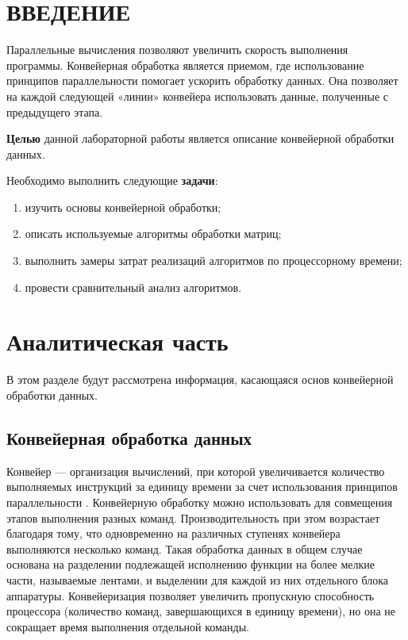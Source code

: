\chapter*{ВВЕДЕНИЕ}

Параллельные вычисления позволяют увеличить скорость выполнения программы. Конвейерная обработка является приемом, где использование принципов параллельности помогает ускорить обработку данных. Она позволяет на каждой следующей «линии» конвейера использовать данные, полученные с предыдущего этапа.

\textbf{Целью} данной лабораторной работы является описание конвейерной обработки данных.

Необходимо выполнить следующие \textbf{задачи}:
\begin{enumerate}
    \item изучить основы конвейерной обработки;
    \item описать используемые алгоритмы обработки матриц;
    \item выполнить замеры затрат реализаций алгоритмов по процессорному времени;
    \item провести сравнительный анализ алгоритмов.
\end{enumerate}

\chapter{Аналитическая часть}
В этом разделе будут рассмотрена информация, касающаяся основ конвейерной обработки данных.


\section{Конвейерная обработка данных}
Конвейер — организация вычислений, при которой увеличивается количество выполняемых инструкций за единицу времени за счет использования
принципов параллельности \cite{conv}.
Конвейерную обработку можно использовать для совмещения этапов
выполнения разных команд. Производительность при этом возрастает благодаря тому, что одновременно на различных ступенях конвейера выполняются
несколько команд. Такая обработка данных в общем случае основана на разделении подлежащей исполнению функции на более мелкие части, называемые
лентами, и выделении для каждой из них отдельного блока аппаратуры.
Конвейеризация позволяет увеличить пропускную способность процессора (количество команд, завершающихся в единицу времени), но она не
сокращает время выполнения отдельной команды.

